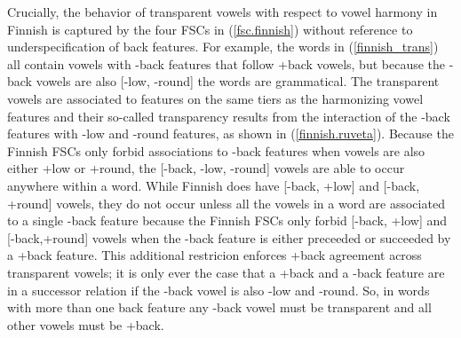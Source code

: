\documentclass[,doc,floatsintext]{apa6}
\theoremstyle{definition}
\theoremstyle{definition}
\theoremstyle{definition}
\theoremstyle{remark}
\begin{document}
Crucially, the behavior of transparent vowels with respect to vowel
harmony in Finnish is captured by the four FSCs in (\ref{fsc.finnish})
without reference to underspecification of back features. For example,
the words in (\ref{finnish_trans}) all contain vowels with -back
features that follow +back vowels, but because the -back vowels are also
{[}-low, -round{]} the words are grammatical. The transparent vowels are
associated to features on the same tiers as the harmonizing vowel
features and their so-called transparency results from the interaction
of the -back features with -low and -round features, as shown in
(\ref{finnish.ruveta}). Because the Finnish FSCs only forbid
associations to -back features when vowels are also either +low or
+round, the {[}-back, -low, -round{]} vowels are able to occur anywhere
within a word. While Finnish does have {[}-back, +low{]} and {[}-back,
+round{]} vowels, they do not occur unless all the vowels in a word are
associated to a single -back feature because the Finnish FSCs only
forbid {[}-back, +low{]} and {[}-back,+round{]} vowels when the -back
feature is either preceeded or succeeded by a +back feature. This
additional restricion enforces +back agreement across transparent
vowels; it is only ever the case that a +back and a -back feature are in
a successor relation if the -back vowel is also -low and -round. So, in
words with more than one back feature any -back vowel must be
transparent and all other vowels must be +back.
\end{document}
